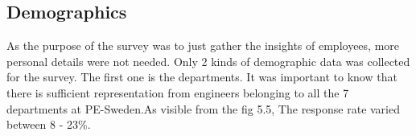 \subsection{Demographics}
As the purpose of the survey was to just gather the insights of employees, more personal details were not needed. Only 2 kinds of demographic data was collected for the survey. The first one is the departments. It was important to know that there is sufficient representation from engineers belonging to all the 7 departments at PE-Sweden.As visible from the fig 5.5, The response rate varied between 8 - 23\%. 

